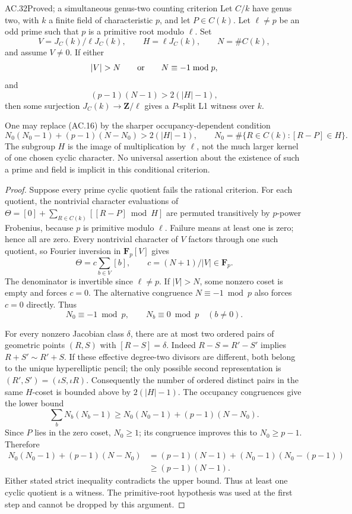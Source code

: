 \begin{claim}{AC.32}{Proved; a simultaneous genus-two counting criterion}
Let \(C/k\) have genus two, with \(k\) a finite field of
characteristic \(p\), and let \(P\in C(k)\).
Let \(\ell\ne p\) be an odd prime such that \(p\) is a primitive
root modulo \(\ell\). Set
\[
 V=J_C(k)/\ell J_C(k),\qquad H=\ell J_C(k),\qquad N=\#C(k),
\]
and assume \(V\ne0\). If either
\[
                  |V|>N\qquad\hbox{or}\qquad N\equiv-1\bmod p,
\]
and
\[
                         (p-1)(N-1)>2(|H|-1),                 \tag{AC.16}
\]
then some surjection \(J_C(k)\to\mathbf Z/\ell\) gives a
\(P\)-split L1 witness over \(k\).

One may replace (AC.16) by the sharper occupancy-dependent
condition
\[
 N_0(N_0-1)+(p-1)(N-N_0)>2(|H|-1),\qquad
 N_0=\#\{R\in C(k):[R-P]\in H\}.
\]
The subgroup \(H\) is the image of multiplication by \(\ell\),
not the much larger kernel of one chosen cyclic character.
No universal assertion about the existence of such a prime and
field is implicit in this conditional criterion.
\end{claim}
\begin{proof}
Suppose every prime cyclic quotient fails the rational criterion.
For each quotient, the nontrivial character evaluations of
\(\Theta=[0]+\sum_{R\in C(k)}[[R-P]\bmod H]\) are permuted
transitively by \(p\)-power Frobenius, because \(p\) is primitive
modulo \(\ell\). Failure means at least one is zero; hence all
are zero. Every nontrivial character of \(V\) factors through
one such quotient, so Fourier inversion in \(\mathbf F_p[V]\)
gives
\[
                 \Theta=c\sum_{b\in V}[b],
                 \qquad c=(N+1)/|V|\in\mathbf F_p.
\]
The denominator is invertible since \(\ell\ne p\).
If \(|V|>N\), some nonzero coset is empty and forces \(c=0\).
The alternative congruence \(N\equiv-1\bmod p\) also forces
\(c=0\) directly. Thus
\[
              N_0\equiv-1\bmod p,\qquad
              N_b\equiv0\bmod p\quad(b\ne0).
\]

For every nonzero Jacobian class \(\delta\), there are at most
two ordered pairs of geometric points \((R,S)\) with
\([R-S]=\delta\).
Indeed \(R-S=R'-S'\) implies
\(R+S'\sim R'+S\). If these effective degree-two divisors are
different, both belong to the unique hyperelliptic pencil;
the only possible second representation is
\((R',S')=(\iota S,\iota R)\).
Consequently the number of ordered distinct pairs in the same
\(H\)-coset is bounded above by \(2(|H|-1)\).
The occupancy congruences give the lower bound
\[
 \sum_bN_b(N_b-1)
   \ge N_0(N_0-1)+(p-1)(N-N_0).
\]
Since \(P\) lies in the zero coset, \(N_0\ge1\); its congruence
improves this to \(N_0\ge p-1\). Therefore
\[
\begin{aligned}
 N_0(N_0-1)+(p-1)(N-N_0)
   &=(p-1)(N-1)+(N_0-1)(N_0-(p-1))\\
   &\ge(p-1)(N-1).
\end{aligned}
\]
Either stated strict inequality contradicts the upper bound.
Thus at least one cyclic quotient is a witness.
The primitive-root hypothesis was used at the first step and
cannot be dropped by this argument.
\end{proof}



